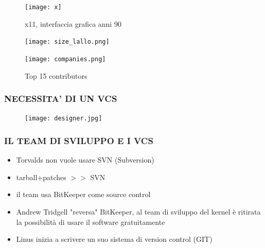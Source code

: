 \documentclass{beamer}
\begin{document}
\begin{frame}[plain]
    \begin{figure}
        \begin{center}
            \texttt{[image: x]}
            \caption{x11, interfaccia grafica anni 90}         
        \end{center}
    \end{figure}
\end{frame}


\begin{frame}
    \begin{figure}
        \begin{center}
            \texttt{[image: size\_lallo.png]}                   
        \end{center}
    \end{figure}
\end{frame}

\begin{frame}
    \begin{figure}
        \begin{center}
            \texttt{[image: companies.png]}
            \caption{Top 15 contributors}
        \end{center}
    \end{figure}
\end{frame}


\begin{frame}
    \frametitle{NECESSITA' DI UN VCS}
        \begin{figure}
            \texttt{[image: designer.jpg]}
        \end{figure}    
\end{frame}

\begin{frame}
    \frametitle{IL TEAM DI SVILUPPO E I VCS}
        \begin{itemize}
            \item Torvalds non vuole usare SVN (Subversion)
            \item tarball+patches $>>$ SVN
            \item il team usa BitKeeper come source control
            \item Andrew Tridgell "reversa" BitKeeper, al team di sviluppo del kernel è ritirata la possibilità di usare il software gratuitamente
            \item Linus inizia a scrivere un suo sistema di version control (GIT)
        \end{itemize}
\end{frame}
\end{document}
